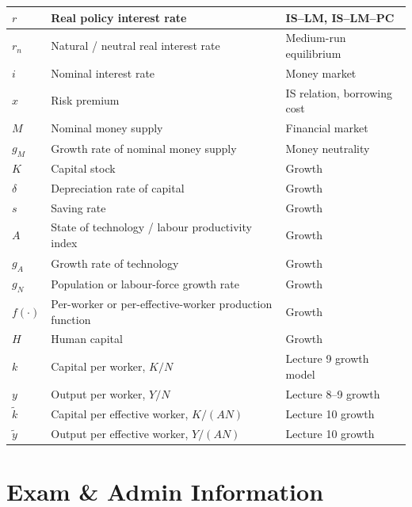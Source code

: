 \documentclass[12pt]{article}
\begin{document}
\begin{center}
\begin{tabular}{|p{2.2cm}|p{7.8cm}|p{5.0cm}|}
$r$ & Real policy interest rate & IS--LM, IS--LM--PC \\
\hline
$r_n$ & Natural / neutral real interest rate & Medium-run equilibrium \\
\hline
$i$ & Nominal interest rate & Money market \\
\hline
$x$ & Risk premium & IS relation, borrowing cost \\
\hline
$M$ & Nominal money supply & Financial market \\
\hline
$g_M$ & Growth rate of nominal money supply & Money neutrality \\
\hline
$K$ & Capital stock & Growth \\
\hline
$\delta$ & Depreciation rate of capital & Growth \\
\hline
$s$ & Saving rate & Growth \\
\hline
$A$ & State of technology / labour productivity index & Growth \\
\hline
$g_A$ & Growth rate of technology & Growth \\
\hline
$g_N$ & Population or labour-force growth rate & Growth \\
\hline
$f(\cdot)$ & Per-worker or per-effective-worker production function & Growth \\
\hline
$H$ & Human capital & Growth \\
\hline
$k$ & Capital per worker, $K/N$ & Lecture 9 growth model \\
\hline
$y$ & Output per worker, $Y/N$ & Lecture 8--9 growth \\
\hline
$\tilde{k}$ & Capital per effective worker, $K/(AN)$ & Lecture 10 growth \\
\hline
$\tilde{y}$ & Output per effective worker, $Y/(AN)$ & Lecture 10 growth \\
\hline
\end{tabular}
\end{center}

\section{Exam \& Admin Information}
\end{document}
